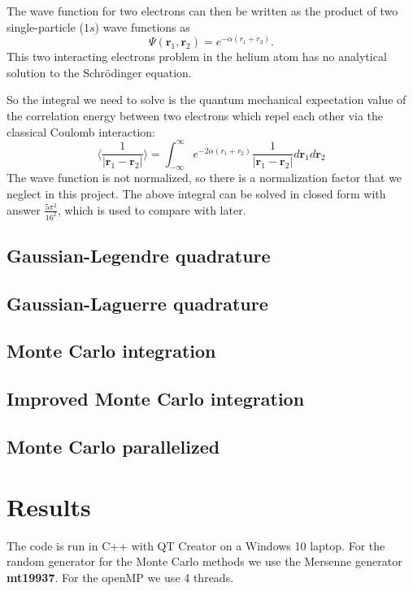 \documentclass[12pt,a4paper,english]{article}
\begin{document}
The wave function for two electrons can then be written as the product of two single-particle ($1s$) wave functions as
\begin{equation}
\label{eq:wave_2}
\Psi(\textbf{r}_1, \textbf{r}_2)=e^{-\alpha(r_1+r_2)}.
\end{equation}
This two interacting electrons problem in the helium atom has no analytical solution to the Schrödinger equation. 

So the integral we need to solve is the quantum mechanical expectation value of the correlation energy between two electrons which repel each other via the classical Coulomb interaction:
\begin{equation}
\label{eq:integral}
\langle\frac{1}{|\textbf{r}_1-\textbf{r}_2|}\rangle=\int_{-\infty}^{\infty}e^{-2\alpha(r_1+r_2)}\frac{1}{|\textbf{r}_1-\textbf{r}_2|}d\textbf{r}_1d\textbf{r}_2
\end{equation}
The wave function is not normalized, so there is a normalization factor that we neglect in this project. The above integral can be solved in closed form with answer $\frac{5\pi^2}{16^2}$, which is used to compare with later.

\subsection{Gaussian-Legendre quadrature}
\subsection{Gaussian-Laguerre quadrature}
\subsection{Monte Carlo integration}
\subsection{Improved Monte Carlo integration}
\subsection{Monte Carlo parallelized}


\section{Results}
The code is run in C++ with QT Creator on a Windows 10 laptop. For the random generator for the Monte Carlo methods we use the Mersenne generator \textbf{mt19937}. For the openMP we use 4 threads.
\end{document}
